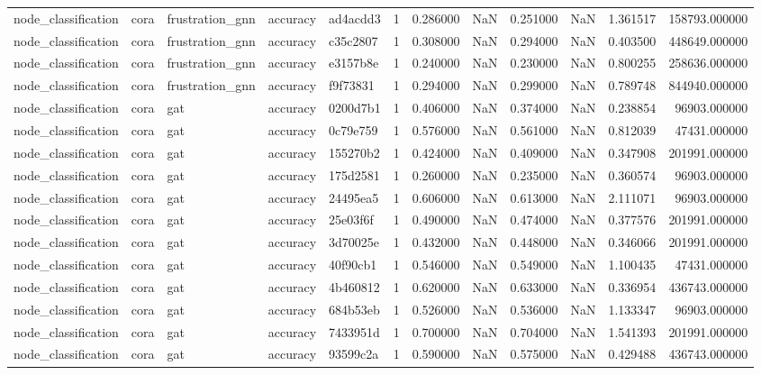 \begin{tabular}{lllllrrrrrrr}
node_classification & cora & frustration_gnn & accuracy & ad4acdd3 & 1 & 0.286000 & NaN & 0.251000 & NaN & 1.361517 & 158793.000000 \\
node_classification & cora & frustration_gnn & accuracy & c35c2807 & 1 & 0.308000 & NaN & 0.294000 & NaN & 0.403500 & 448649.000000 \\
node_classification & cora & frustration_gnn & accuracy & e3157b8e & 1 & 0.240000 & NaN & 0.230000 & NaN & 0.800255 & 258636.000000 \\
node_classification & cora & frustration_gnn & accuracy & f9f73831 & 1 & 0.294000 & NaN & 0.299000 & NaN & 0.789748 & 844940.000000 \\
node_classification & cora & gat & accuracy & 0200d7b1 & 1 & 0.406000 & NaN & 0.374000 & NaN & 0.238854 & 96903.000000 \\
node_classification & cora & gat & accuracy & 0c79e759 & 1 & 0.576000 & NaN & 0.561000 & NaN & 0.812039 & 47431.000000 \\
node_classification & cora & gat & accuracy & 155270b2 & 1 & 0.424000 & NaN & 0.409000 & NaN & 0.347908 & 201991.000000 \\
node_classification & cora & gat & accuracy & 175d2581 & 1 & 0.260000 & NaN & 0.235000 & NaN & 0.360574 & 96903.000000 \\
node_classification & cora & gat & accuracy & 24495ea5 & 1 & 0.606000 & NaN & 0.613000 & NaN & 2.111071 & 96903.000000 \\
node_classification & cora & gat & accuracy & 25e03f6f & 1 & 0.490000 & NaN & 0.474000 & NaN & 0.377576 & 201991.000000 \\
node_classification & cora & gat & accuracy & 3d70025e & 1 & 0.432000 & NaN & 0.448000 & NaN & 0.346066 & 201991.000000 \\
node_classification & cora & gat & accuracy & 40f90cb1 & 1 & 0.546000 & NaN & 0.549000 & NaN & 1.100435 & 47431.000000 \\
node_classification & cora & gat & accuracy & 4b460812 & 1 & 0.620000 & NaN & 0.633000 & NaN & 0.336954 & 436743.000000 \\
node_classification & cora & gat & accuracy & 684b53eb & 1 & 0.526000 & NaN & 0.536000 & NaN & 1.133347 & 96903.000000 \\
node_classification & cora & gat & accuracy & 7433951d & 1 & 0.700000 & NaN & 0.704000 & NaN & 1.541393 & 201991.000000 \\
node_classification & cora & gat & accuracy & 93599c2a & 1 & 0.590000 & NaN & 0.575000 & NaN & 0.429488 & 436743.000000 \\

\end{tabular}
